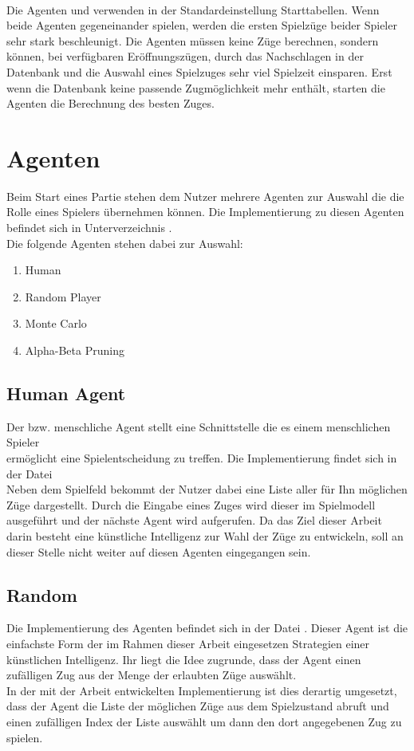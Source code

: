 \\Die Agenten  und  verwenden in der Standardeinstellung Starttabellen. Wenn beide Agenten gegeneinander spielen, werden die ersten Spielzüge beider Spieler sehr stark beschleunigt. Die Agenten müssen keine Züge berechnen, sondern können, bei verfügbaren Eröffnungszügen, durch das Nachschlagen in der Datenbank und die Auswahl eines Spielzuges sehr viel Spielzeit einsparen. Erst wenn die Datenbank keine passende Zugmöglichkeit mehr enthält, starten die Agenten die Berechnung des besten Zuges.
\section{Agenten}
\label{agenten}
Beim Start eines Partie stehen dem Nutzer mehrere Agenten zur Auswahl die die Rolle eines Spielers übernehmen können. Die Implementierung zu diesen Agenten befindet sich in Unterverzeichnis .
\\Die folgende Agenten stehen dabei zur Auswahl:
\begin{enumerate}
\item Human
\item Random Player
\item Monte Carlo
\item Alpha-Beta Pruning
\end{enumerate}
\subsection{Human Agent}
Der  bzw. menschliche Agent stellt eine Schnittstelle die es einem menschlichen Spieler \\ermöglicht eine Spielentscheidung zu treffen. Die Implementierung findet sich in der Datei 
\\Neben dem Spielfeld bekommt der Nutzer dabei eine Liste aller für Ihn möglichen Züge dargestellt. Durch die Eingabe eines Zuges wird dieser im Spielmodell ausgeführt und der nächste Agent wird aufgerufen. Da das Ziel dieser Arbeit darin besteht eine künstliche Intelligenz zur Wahl der Züge zu entwickeln, soll an dieser Stelle nicht weiter auf diesen Agenten eingegangen sein.

\subsection{Random}
Die Implementierung des Agenten  befindet sich in der Datei . Dieser Agent ist die einfachste Form der im Rahmen dieser Arbeit eingesetzen Strategien einer künstlichen Intelligenz. Ihr liegt die Idee zugrunde, dass der Agent einen zufälligen Zug aus der Menge der erlaubten Züge auswählt.
\\In der mit der Arbeit entwickelten Implementierung ist dies derartig umgesetzt, dass der Agent die Liste der möglichen Züge aus dem Spielzustand abruft und einen zufälligen Index der Liste auswählt um dann den dort angegebenen Zug zu spielen.

